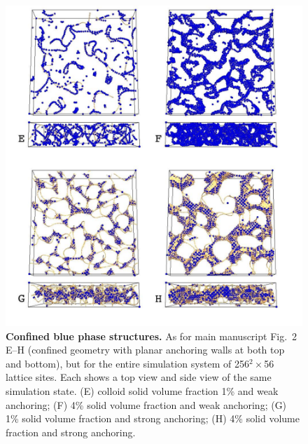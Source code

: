 \documentclass[12pt,twoside]{article}
\begin{document}
\begin{figure}[!h]
\begin{center}
\includegraphics[scale=0.42]{support-fig6.pdf}
\end{center}
\caption{\textbf{Confined blue phase structures.}
As for main manuscript Fig.~2 E--H (confined geometry with planar
anchoring walls at both top and bottom), but for the entire simulation
system of 256$^2\times$56 lattice sites. Each shows a top view and
side view of the same simulation state. (E) colloid solid volume fraction 1\%
and weak anchoring; (F) 4\% solid volume fraction and weak anchoring;
(G) 1\% solid volume fraction and strong anchoring; (H) 4\% solid
volume fraction and strong anchoring.}
\end{figure}

\newpage
\end{document}
